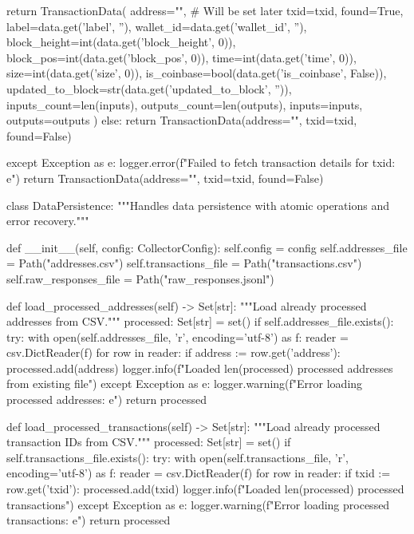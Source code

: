 \begin{codelisting}[language=Python, caption=Основной скрипт сбора данных]
                return TransactionData(
                    address="",  # Will be set later
                    txid=txid,
                    found=True,
                    label=data.get('label', ''),
                    wallet_id=data.get('wallet_id', ''),
                    block_height=int(data.get('block_height', 0)),
                    block_pos=int(data.get('block_pos', 0)),
                    time=int(data.get('time', 0)),
                    size=int(data.get('size', 0)),
                    is_coinbase=bool(data.get('is_coinbase', False)),
                    updated_to_block=str(data.get('updated_to_block', '')),
                    inputs_count=len(inputs),
                    outputs_count=len(outputs),
                    inputs=inputs,
                    outputs=outputs
                )
            else:
                return TransactionData(address="", txid=txid, found=False)
                
        except Exception as e:
            logger.error(f"Failed to fetch transaction details for {txid}: {e}")
            return TransactionData(address="", txid=txid, found=False)


class DataPersistence:
    """Handles data persistence with atomic operations and error recovery."""
    
    def __init__(self, config: CollectorConfig):
        self.config = config
        self.addresses_file = Path("addresses.csv")
        self.transactions_file = Path("transactions.csv")
        self.raw_responses_file = Path("raw_responses.jsonl")
        
    def load_processed_addresses(self) -> Set[str]:
        """Load already processed addresses from CSV."""
        processed: Set[str] = set()
        if self.addresses_file.exists():
            try:
                with open(self.addresses_file, 'r', encoding='utf-8') as f:
                    reader = csv.DictReader(f)
                    for row in reader:
                        if address := row.get('address'):
                            processed.add(address)
                logger.info(f"Loaded {len(processed)} processed addresses from existing file")
            except Exception as e:
                logger.warning(f"Error loading processed addresses: {e}")
        return processed
    
    def load_processed_transactions(self) -> Set[str]:
        """Load already processed transaction IDs from CSV."""
        processed: Set[str] = set()
        if self.transactions_file.exists():
            try:
                with open(self.transactions_file, 'r', encoding='utf-8') as f:
                    reader = csv.DictReader(f)
                    for row in reader:
                        if txid := row.get('txid'):
                            processed.add(txid)
                logger.info(f"Loaded {len(processed)} processed transactions")
            except Exception as e:
                logger.warning(f"Error loading processed transactions: {e}")
        return processed
    

\end{codelisting}
